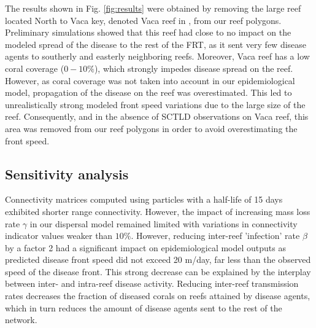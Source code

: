 The results shown in Fig. \ref{fig:results} were obtained by removing the large reef located North to Vaca key, denoted Vaca reef in \cite{frys20}, from our reef polygons. Preliminary simulations showed that this reef had close to no impact on the modeled spread of the disease to the rest of the FRT, as it sent very few disease agents to southerly and easterly neighboring reefs. Moreover, Vaca reef has a low coral coverage ($0-10\%$), which strongly impedes disease spread on the reef. However, as coral coverage was not taken into account in our epidemiological model, propagation of the disease on the reef was overestimated. This led to unrealistically strong modeled front speed variations due to the large size of the reef. Consequently, and in the absence of SCTLD observations on Vaca reef, this area was removed from our reef polygons in order to avoid overestimating the front speed.



\subsection{Sensitivity analysis}
Connectivity matrices computed using particles with a half-life of 15 days exhibited shorter range connectivity. However, the impact of increasing mass loss rate $\gamma$ in our dispersal model remained limited with variations in connectivity indicator values weaker than $10\%$. However, reducing inter-reef 'infection' rate $\beta$ by a factor 2 had a significant impact on epidemiological model outputs as predicted disease front speed did not exceed 20 m/day, far less than the observed speed of the disease front. This strong decrease can be explained by the interplay between inter- and intra-reef disease activity. Reducing inter-reef transmission rates decreases the fraction of diseased corals on reefs attained by disease agents, which in turn reduces the amount of disease agents sent to the rest of the network.


